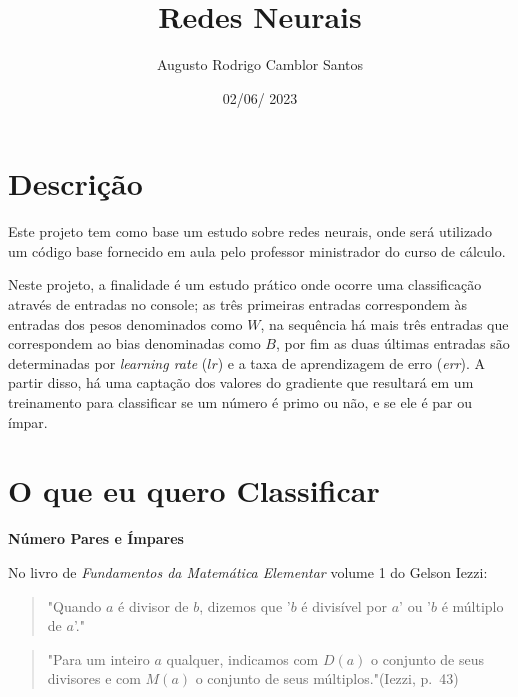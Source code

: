 \documentclass{article}
\title{Redes Neurais}
\author{Augusto Rodrigo Camblor Santos }
\date{02/06/ 2023}
\begin{document}
\maketitle

\section{Descrição}

\begin{flushleft}
Este projeto tem como base um estudo sobre redes neurais, onde será utilizado um código base fornecido em aula pelo professor ministrador do curso de cálculo.
\end{flushleft}
\begin{flushleft}
Neste projeto, a finalidade é um estudo prático onde ocorre uma classificação através de entradas no console; as três primeiras entradas correspondem às entradas dos pesos denominados como $W$, na sequência há mais três entradas que correspondem ao bias denominadas como $B$, por fim as duas últimas entradas são determinadas por \textit{learning rate} ($lr$) e a taxa de aprendizagem de erro (\textit{err}). A partir disso, há uma captação dos valores do gradiente que resultará em um treinamento para classificar se um número é primo ou não, e se ele é par ou ímpar.
\end{flushleft}

\section{O que eu quero Classificar}

\textbf{Número Pares e Ímpares}

\begin{flushleft}
No livro de \textit{Fundamentos da Matemática Elementar} volume 1 do Gelson Iezzi:
\end{flushleft}

\begin{quote}
    \setlength{\parindent}{4cm}
    \setlength{\baselineskip}{1.5\baselineskip}
    \fontsize{10}{10}\selectfont
    "Quando $a$ é divisor de $b$, dizemos que '$b$ é divisível por $a$' ou '$b$ é múltiplo de $a$'."
\end{quote}
\begin{quote}
    \setlength{\parindent}{4cm}
    \setlength{\baselineskip}{1.5\baselineskip}
    \fontsize{10}{10}\selectfont
    "Para um inteiro $a$ qualquer, indicamos com $D(a)$ o conjunto de seus divisores e com $M(a)$ o conjunto de seus múltiplos."(Iezzi, p.~43)\cite{iezzifundamentos}
\end{quote}
\end{document}
